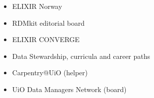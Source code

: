 \documentclass[10pt,a4paper,ragged2e,withhyper]{altacv}
\begin{document}
\begin{paracol}{2}












        {
          \begin{itemize}
          \item ELIXIR Norway
          \item RDMkit editorial board
          \item ELIXIR CONVERGE
          \end{itemize}
        }
        {}{}


        {
          \begin{itemize}
          \item Data Stewardship, curricula and career paths
          \end{itemize}
        }
        {}{}

        {
          \begin{itemize}
          \item Carpentry@UiO (helper)
          \item UiO Data Managers Network (board)
          \end{itemize}
        }
        {}{}
        









\end{paracol}
\end{document}
